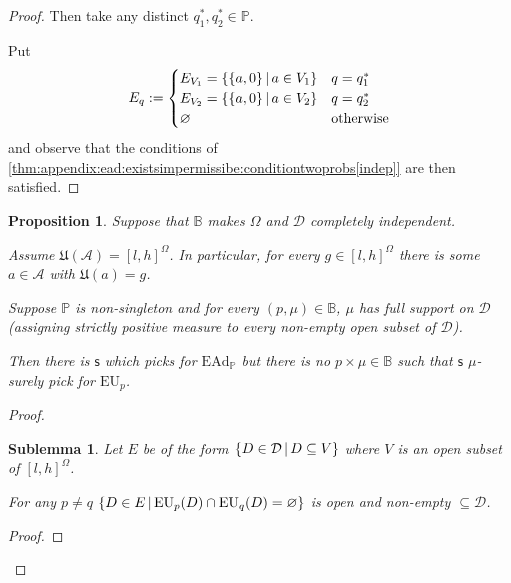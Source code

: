 \documentclass[a4paper]{article}
\newtheorem{proposition}[theorem]{Proposition}
\newtheorem{sublemma}{Sublemma}[theorem]
\newcommand\A{\mathcal{A}}
\renewcommand\P{\mathbb{P}} %
\newcommand\Exp{\mathsf{Exp}}
\newcommand\EU{\mathrm{EU}}
\newcommand\EAd{\mathrm{EAd}}
\newcommand\U{\mathfrak{U}} %
\newcommand{\D}{\mathcal{D}}
\newcommand{\Decs}{\mathcal{D}}
\newcommand\s{\mathsf{s}}
\newcommand{\IB}{\mathbb{B}}
\newcommand{\IP}{\P}
\renewcommand{\color}[1]{}
\newenvironment{colored}[1]{\leavevmode\color{#1}}{}
\newcommand\SetDelimiter[1][]{
	\nonscript\,#1\vert \allowbreak \nonscript\,\mathopen{}}
\providecommand\given{\SetDelimiter}
\renewcommand{\emptyset}{\varnothing}
\newenvironment{CCM rewritten}
{\begingroup\color{blue}} %
{\endgroup}              %
\begin{document}
\begin{colored}{violet}
\begin{proof}
Then take any distinct $q^*_1,q^*_2\in\IP$. 

Put $$E_q:=\begin{cases}
	E_{V_1}=\{\{a,0\}\given a\in V_1\}&q=q^*_1\\
	E_{V_2}=\{\{a,0\}\given a\in V_2\}&q=q^*_2\\
	\emptyset&\text{otherwise}
\end{cases}$$
and observe that the conditions of \cref{thm:appendix:ead:existsimpermissibe:conditiontwoprobs[indep]} are then satisfied. 
\end{proof}


\begin{proposition}Suppose that $\IB$ makes $\Omega$ and $\Decs$ completely independent. 
	
	Assume $\U(\A)=[l,h]^\Omega$. In particular, for every $g\in [l,h]^\Omega$ there is some $a\in \A$ with $\U(a)=g$. 
	
	Suppose $\IP$ is non-singleton and for every $(p,\mu)\in\IB$, $\mu$ has full support on $\Decs$ (assigning strictly positive measure to every non-empty open subset of $\Decs$).
	
	Then there is $\s$ which picks for $\EAd_\IP$ but there is no $p\times\mu\in \IB$ such that $\s$ $\mu$-surely pick for $\EU_p$.
	
\end{proposition}
\begin{proof}
	\begin{sublemma}
		Let $E$ be of the form $\{D\in\D\given D\subseteq V\}$ where $V$ is an open subset of $[l,h]^\Omega$.
		
		For any $p\neq q$
		$\{D\in E\given \EU_{p}(D)\cap \EU_{q}(D)=\emptyset\}$ is open and non-empty $\subseteq\Decs$.
	\end{sublemma}
	\begin{proof}
		
		

\end{proof}
\end{proof}
\end{colored}
\end{document}
